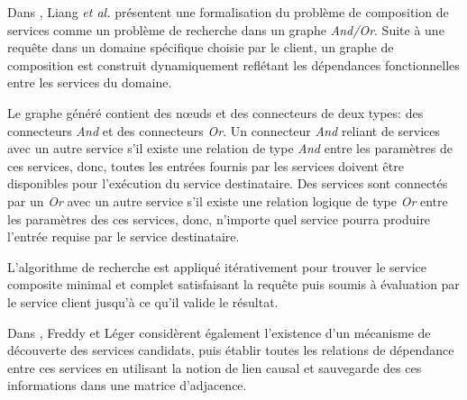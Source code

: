   \begin{text}
    Dans \cite{liang2005and}, Liang \textit{et al.} présentent une
    formalisation du problème de composition de services comme un
    problème de recherche dans un graphe \textit{And/Or}. Suite à une
    requête dans un domaine spécifique choisie par le client, un
    graphe de composition est construit dynamiquement reflétant les
    dépendances fonctionnelles entre les services du domaine.

    Le graphe généré contient des nœuds et des connecteurs de deux
    types: des connecteurs \textit{And} et des connecteurs
    \textit{Or}. Un connecteur \textit{And} reliant de services avec
    un autre service s'il existe une relation de type \textit{And}
    entre les paramètres de ces services, donc, toutes les entrées
    fournis par les services doivent être disponibles pour l'exécution
    du service destinataire. Des services sont connectés par un
    \textit{Or} avec un autre service s'il existe une relation logique
    de type \textit{Or} entre les paramètres des ces services, donc,
    n'importe quel service pourra produire l'entrée requise par le
    service destinataire.

    L'algorithme de recherche est appliqué itérativement pour trouver
    le service composite minimal et complet satisfaisant la requête
    puis soumis à évaluation par le service client jusqu'à ce qu'il
    valide le résultat.
  \end{text}

  \begin{text}
    Dans \cite{lecue2006formal}, Freddy et Léger considèrent également
    l'existence d'un mécanisme de découverte des services candidats,
    puis établir toutes les relations de dépendance entre ces services
    en utilisant la notion de lien causal et sauvegarde des ces
    informations dans une matrice d'adjacence.

  \end{text}

